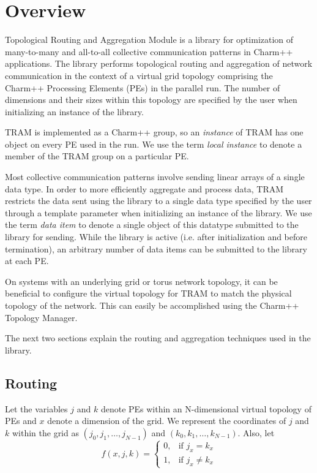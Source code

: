 \newcommand{\code}[1]{\textsf{#1}}
\label{TRAM}
\section{Overview}

Topological Routing and Aggregation Module is a library for optimization of
many-to-many and all-to-all collective communication patterns in Charm++
applications. The library performs topological routing and aggregation of
network communication in the context of a virtual grid topology comprising the
Charm++ Processing Elements (PEs) in the parallel run. The number of dimensions
and their sizes within this topology are specified by the user when initializing
an instance of the library.

TRAM is implemented as a Charm++ group, so an \emph{instance}
of TRAM has one object on every PE used in the run. We use
the term \emph{local instance} to denote a member of the TRAM
group on a particular PE.

Most collective communication patterns involve sending linear arrays
of a single data type. In order to more efficiently aggregate and
process data, TRAM restricts the data sent using the
library to a single data type specified by the user through a template
parameter when initializing an instance of the library. We use the
term \emph{data item} to denote a single object of this datatype
submitted to the library for sending. While the library is active
(i.e. after initialization and before termination), an arbitrary
number of data items can be submitted to the library at each PE.

On systems with an underlying grid or torus network topology, it can be
beneficial to configure the virtual topology for TRAM to match the physical
topology of the network. This can easily be accomplished using the Charm++
Topology Manager.

The next two sections explain the routing and aggregation techniques
used in the library.

\subsection{Routing}

Let the variables $j$ and $k$ denote PEs within an N-dimensional
virtual topology of PEs and $x$ denote a dimension of the grid. We
represent the coordinates of $j$ and $k$ within the grid as $\left
(j_0, j_1, \ldots, j_{N-1} \right) $ and $ \left (k_0, k_1, \ldots,
k_{N-1} \right) $.  Also, let
\[
f(x, j, k) =
\begin{cases}
0, & \text{if } j_x = k_x \\
1, & \text{if } j_x \ne k_x
\end{cases}
\]

